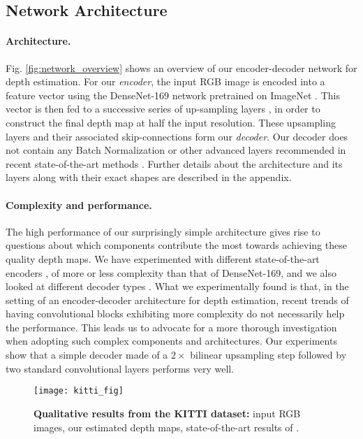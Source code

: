 \documentclass[10pt,twocolumn,letterpaper]{article}
\begin{document}
\subsection{Network Architecture}

\paragraph{Architecture.} Fig. \ref{fig:network_overview} shows an overview of our encoder-decoder network for depth estimation. For our \textit{encoder}, the input RGB image is encoded into a feature vector using the DenseNet-169 \cite{huang2017densely} network pretrained on ImageNet \cite{Deng2009}. This vector is then fed to a successive series of up-sampling layers \cite{LehtinenMHLKAA18}, in order to construct the final depth map at half the input resolution. These upsampling layers and their associated skip-connections form our \textit{decoder}. Our decoder does not contain any Batch Normalization \cite{Ioffe2015BNA} or other advanced layers recommended in recent state-of-the-art methods \cite{Fu2018DeepOR,Hao2018DetailPD}. Further details about the architecture and its layers along with their exact shapes are described in the appendix.

\paragraph{Complexity and performance.} The high performance of our surprisingly simple architecture gives rise to questions about which components contribute the most towards achieving these quality depth maps. We have experimented with different state-of-the-art encoders \cite{Bianco2018}, of more or less complexity than that of DenseNet-169, and we also looked at different decoder types \cite{Laina2016, Wojna2017TheDI}. What we experimentally found is that, in the setting of an encoder-decoder architecture for depth estimation, recent trends of having convolutional blocks exhibiting more complexity do not necessarily help the performance. This leads us to advocate for a more thorough investigation when adopting such complex components and architectures. Our experiments show that a simple decoder made of a $2\times$ bilinear upsampling step followed by two standard convolutional layers performs very well.


\begin{figure*}[t]
\begin{center}
\texttt{[image: kitti\_fig]}
\end{center}
   \caption{\textbf{Qualitative results from the KITTI dataset:} input RGB images, our estimated depth maps, state-of-the-art results of \cite{Fu2018DeepOR}.}
\label{fig:kitti}
\end{figure*}
\end{document}
